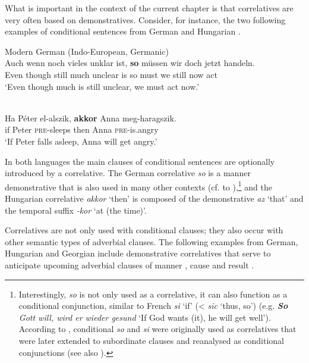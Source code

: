 \documentclass[output=paper,colorlinks,citecolor=brown]{langscibook}
\begin{document}
What is important in the context of the current chapter is that correlatives are very often based on demonstratives. Consider, for instance, the two following examples of conditional sentences from German  and Hungarian .

\ea\label{ex:diessel:36}
{Modern German (Indo-European, Germanic)}\\
\gll Auch   wenn   noch   vieles  unklar   ist,  {\op}\textbf{so}{\cp}  müssen wir  doch  jetzt  handeln. \\
     Even   though  still  much  unclear  is  {\db}so  must we  still  now  act\\
\glt ‘Even though much is still unclear, we must act now.’
\z

\ea\label{ex:diessel:37}
\\
\gll Ha   Péter   el-alszik,   {\op}\textbf{akkor}{\cp}   Anna   meg-haragszik.\\
     if   Peter   \textsc{pre}-sleeps   {\db}then   Anna   \textsc{pre}-is.angry\\
\glt ‘If Peter falls asleep, Anna will get angry.’
\z

In both languages the main clauses of conditional sentences are optionally introduced by a correlative. The German correlative \textit{so} is a manner demonstrative that is also used in many other contexts (cf.  to ),\footnote{Interestingly, \textit{so} is not only used as a correlative, it can also function as a conditional conjunction, similar to French \textit{si} ‘if’ (< \textit{sīc} ‘thus, so’) (e.g. \textit{\textbf{So} Gott will, wird er wieder gesund} ‘If God wants (it), he will get well’). According to \citet{Traugott1985}, conditional \textit{so} and \textit{si} were originally used as correlatives that were later extended to subordinate clauses and reanalysed as conditional conjunctions (see also \citealt{Harris1986}).} and the Hungarian correlative \textit{akkor} ‘then’ is composed of the demonstrative \textit{az} ‘that’ and the temporal suffix \textit{-kor} ‘at (the time)’.

Correlatives are not only used with conditional clauses; they also occur with other semantic types of adverbial clauses. The following examples from German, Hungarian and Georgian include demonstrative correlatives that serve to anticipate upcoming adverbial clauses of manner , cause  and result .
\end{document}
